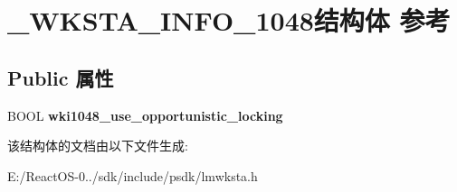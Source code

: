 \hypertarget{struct___w_k_s_t_a___i_n_f_o__1048}{}\section{\+\_\+\+W\+K\+S\+T\+A\+\_\+\+I\+N\+F\+O\+\_\+1048结构体 参考}
\label{struct___w_k_s_t_a___i_n_f_o__1048}
\subsection*{Public 属性}
\begin{DoxyCompactItemize}
\item 
\mbox{\label{struct___w_k_s_t_a___i_n_f_o__1048_a298068a55e2d069b41fcb893a2800885}} 
B\+O\+OL {\bfseries wki1048\+\_\+use\+\_\+opportunistic\+\_\+locking}
\end{DoxyCompactItemize}


该结构体的文档由以下文件生成\+:\begin{DoxyCompactItemize}
\item 
E\+:/\+React\+O\+S-\/0../sdk/include/psdk/lmwksta.\+h\end{DoxyCompactItemize}
